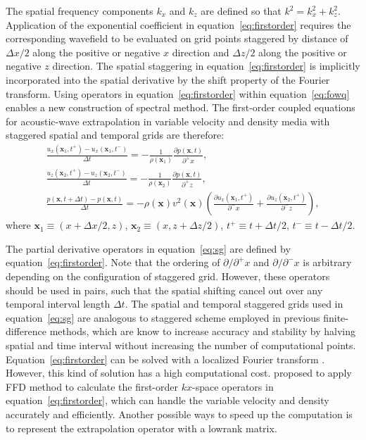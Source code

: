 The spatial frequency components $k_x$ and $k_z$ are defined so that $k^2=k_x^2+k_z^2$. Application of the exponential coefficient in equation~\ref{eq:firstorder} requires the corresponding wavefield to be evaluated on grid points staggered by distance of $\Delta x/2$ along the positive or negative $x$ direction and $\Delta z/2$ along the positive or negative $z$ direction. The spatial staggering in equation~\ref{eq:firstorder} is implicitly incorporated into the spatial derivative by the shift property of the Fourier transform. Using operators in equation~\ref{eq:firstorder} within equation~\ref{eq:fowq} enables a new construction of spectral method. The first-order coupled equations for acoustic-wave extrapolation in variable velocity and density media with staggered spatial and temporal grids are therefore:
\begin{equation}
\label{eq:sg}
\begin{array}{l}
\displaystyle \frac{u_x(\mathbf{x}_1,t^+) - u_x(\mathbf{x}_1,t^-)}{\Delta t} = -\frac{1}{\rho(\mathbf{x}_1)}\frac{\partial p(\mathbf{x},t)}{\partial^+x}, \\
\displaystyle \frac{u_z(\mathbf{x}_2,t^+) - u_z(\mathbf{x}_2,t^-)}{\Delta t} = -\frac{1}{\rho(\mathbf{x}_2)}\frac{\partial p(\mathbf{x},t)}{\partial^+z}, \\
\displaystyle \frac{p(\mathbf{x},t+\Delta t)-p(\mathbf{x},t)}{\Delta t} = -\rho(\mathbf{x})v^2(\mathbf{x})(\frac{\partial u_x(\mathbf{x}_1,t^+)}{\partial^- x}+ \displaystyle \frac{\partial u_z(\mathbf{x}_2,t^+)}{\partial^- z}), 
\end{array}
\end{equation}
where $\mathbf{x}_1\equiv(x+\Delta x/2, z)$, $\mathbf{x}_2\equiv(x, z+\Delta z/2)$, $t^+ \equiv t+\Delta t/2$, $t^- \equiv t-\Delta t/2$.

The partial derivative operators in equation~\ref{eq:sg} are defined by equation~\ref{eq:firstorder}. Note that the ordering of $\partial/\partial^+x$ and $\partial/\partial^-x$ is arbitrary depending on the configuration of staggered grid. However, these operators should be used in pairs, such that the spatial shifting cancel out over any temporal interval length $\Delta t$. The spatial and temporal staggered grids used in equation~\ref{eq:sg} are analogous to staggered scheme employed in previous finite-difference methods\cite[]{madariaga, virieux1984, virieux1986}, which are know to increase accuracy and stability by halving spatial and time interval without increasing the number of computational points. Equation~\ref{eq:firstorder} can be solved with a localized Fourier transform \cite[]{wards2008}. However, this kind of solution has a high computational cost. \cite{songffd} proposed to apply FFD method to calculate the first-order $kx$-space operators in equation~\ref{eq:firstorder}, which can handle the variable velocity and density accurately and efficiently. Another possible ways to speed up the computation is to represent the extrapolation operator with a lowrank matrix.  


